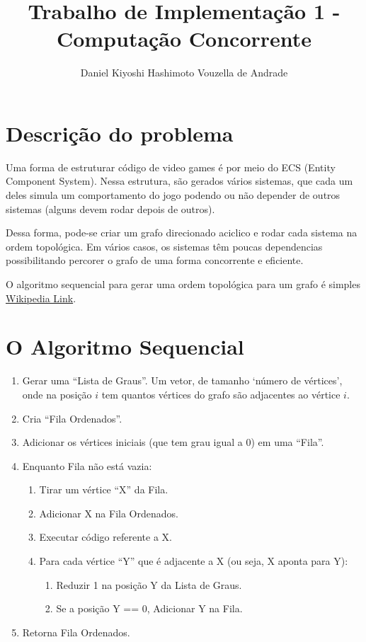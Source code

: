\documentclass[12pt]{article}
\begin{document}
\title{Trabalho de Implementação 1 - Computação Concorrente}
\author{Daniel Kiyoshi Hashimoto Vouzella de Andrade}
\date{}
\maketitle

\section{Descrição do problema}

Uma forma de estruturar código de video games
é por meio do ECS (Entity Component System).
Nessa estrutura, são gerados vários sistemas,
que cada um deles simula um comportamento do jogo
podendo ou não depender de outros sistemas
(alguns devem rodar depois de outros).

Dessa forma, pode-se criar um grafo direcionado
aciclico e rodar cada sistema na ordem topológica.
Em vários casos, os sistemas têm poucas dependencias
possibilitando percorer o grafo de uma forma
concorrente e eficiente.

O algoritmo sequencial para gerar
uma ordem topológica para um grafo é simples
\href{https://en.wikipedia.org/wiki/Topological_sorting}
{Wikipedia Link}.

\newpage
\section{O Algoritmo Sequencial}

\begin{enumerate}
	\item Gerar uma ``Lista de Graus''.
		Um vetor, de tamanho `número de vértices',
		onde na posição $i$ tem quantos vértices do grafo são adjacentes
		ao vértice $i$.
	\item Cria ``Fila Ordenados''.
	\item Adicionar os vértices iniciais (que tem grau igual a 0)
		em uma ``Fila''.
	\item Enquanto Fila não está vazia:
	\begin{enumerate}
		\item Tirar um vértice ``X'' da Fila.
		\item Adicionar X na Fila Ordenados.
		\item Executar código referente a X.
		\item Para cada vértice ``Y'' que é adjacente a X
			(ou seja, X aponta para Y):
		\begin{enumerate}
			\item Reduzir 1 na posição Y da Lista de Graus.
			\item Se a posição Y == 0, Adicionar Y na Fila.
		\end{enumerate}
	\end{enumerate}
	\item Retorna Fila Ordenados.
\end{enumerate}
\end{document}
